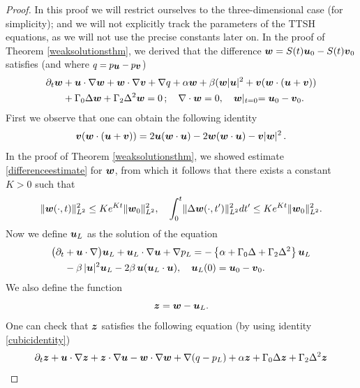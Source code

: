 \documentclass[11pt]{amsart}
\newcommand{\bu}{\mbox{\boldmath$u$}}
\newcommand{\bv}{\mbox{\boldmath$v$}}
\newcommand{\bw}{\mbox{\boldmath$w$}}
\newcommand{\bz}{\mbox{\boldmath$z$}}
\newcommand{\Rb}{\beta}
\newcommand{\Gamzero}{\Gamma_{0}}
\newcommand{\Gamtwo}{\Gamma_{2}}
\theoremstyle{definition}
\numberwithin{equation}{section}
\numberwithin{equation}{section}
\begin{document}
\begin{proof}
In this proof we will restrict ourselves to the three-dimensional case (for simplicity); and we will not explicitly track the parameters of the TTSH equations, as we will not use the precise constants later on. In the proof of Theorem \ref{weaksolutionsthm}, we derived that the difference $\bw = S(t) \bu_0 - S(t) \bv_0$ satisfies (and where $q = p_{\small\bu} - p_{\small\bv}$)
\begin{align*}
\partial_t \bw &+ \bu \cdot \nabla \bw + \bw \cdot \nabla \bv + \nabla q + \alpha \bw + \Rb ( \bw \lvert \bu \rvert^2 + \bv ( \bw \cdot (\bu + \bv) ) \\
&+ \Gamzero \Delta \bw + \Gamtwo \Delta^2 \bw = 0\,; \quad \nabla \cdot \bw = 0, \quad \bw \lvert_{t = 0} = \bu_0 - \bv_0.
\end{align*}
First we observe that one can obtain the following identity
\begin{equation} \label{cubicidentity}
\bv ( \bw \cdot (\bu + \bv) ) = 2 \bu (\bw \cdot \bu) - 2 \bw (\bw \cdot \bu) - \bv \lvert \bw \rvert^2\,.
\end{equation}
In the proof of Theorem \ref{weaksolutionsthm}, we showed estimate \eqref{differenceestimate} for $\bw$, from which it follows that there exists a constant $K > 0$ such that
\begin{equation} \label{differencebound}
\lVert \bw (\cdot, t) \rVert_{L^2}^2 \leq K e^{K t} \lVert \bw_0 \rVert_{L^2}^2, \quad \int_0^t \lVert \Delta \bw (\cdot, t') \rVert_{L^2}^2 dt' \leq K e^{K t} \lVert \bw_0 \rVert_{L^2}^2.
\end{equation}
Now we define $\bu_L$ as the solution of the equation
\begin{align}
\big(\partial_{t} &+ \bu\cdot\nabla\big)\bu_L + \bu_L\cdot\nabla\bu + \nabla p_L
= -\left\{\alpha + \Gamzero \Delta + \Gamtwo \Delta^{2}\right\}\bu_L\nonumber\\
&- \Rb\,\lvert \bu \rvert^{2}\bu_L - 2\Rb\,\bu(\bu_L \cdot \bu ), \quad \bu_L (0) = \bu_0 - \bv_0. \nonumber
\end{align}
We also define the function
\begin{equation}
\bz = \bw - \bu_L.
\end{equation}
One can check that $\bz$ satisfies the following equation (by using identity \eqref{cubicidentity})
\begin{align*}
\partial_t \bz &+ \bu \cdot \nabla \bz + \bz \cdot \nabla \bu - \bw \cdot \nabla \bw + \nabla (q - p_L) + \alpha \bz + \Gamzero \Delta \bz + \Gamtwo \Delta^2 \bz \\

\end{align*}
\end{proof}
\end{document}
